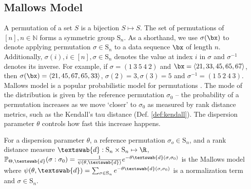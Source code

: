 
\subsection{Mallows Model} \label{sec:background:MM}
A permutation of a set $S$ is a bijection $S\mapsto S$. The set of permutations of $[n], n \in \mathbb{N}$ forms a symmetric group $\mathrm{S}_n$. As a shorthand, we use $\sigma(\bx)$ to denote applying permutation $\sigma \in \mathrm{S}_n$ to a data sequence $\bx$ of length $n$. Additionally, $\sigma(i), i\in [n], \sigma \in \mathrm{S}_n$ denotes the value at index $i$ in $\sigma$ and $\sigma^{-1}$ denotes its inverse. For example, if $\sigma=( 1 \: 3 \: 5\: 4\: 2)$ and $\bx=\langle 21, 33, 45, 65 , 67\rangle$, then $\sigma(\bx)=\langle 21, 45, 67, 65, 33\rangle$, $\sigma(2)=3, \sigma(3)=5$ and $\sigma^{-1}=(1 \: 5 \: 2 \: 4 \: 3)$.
\\Mallows model is a popular probabilistic model for permutations \citep{MM}.  %
The mode of the distribution is given
by the reference permutation $\sigma_0$ -- the probability of a permutation increases as we move `closer' to $\sigma_0$ as measured by rank distance metrics, such as the Kendall's tau distance (Def. \ref{def:kendall}). The dispersion parameter $\theta$ controls how fast this increase happens.  %


\begin{defn}
\label{def: mallows}
For a dispersion parameter $\theta$, a reference permutation $\sigma_o \in \mathrm{S}_n$, and a rank distance measure $\textswab{d}: \mathrm{S}_n \times \mathrm{S}_n \mapsto \R $,   
$
\mathbb{P}_{\Theta,\textswab{d}}(\sigma:\sigma_0)=\frac{1}{\psi(\theta,\textswab{d})} e^{-\theta  \textswab{d}(\sigma, \sigma_0)}$
is the Mallows model where $\psi(\theta,\textswab{d})=\sum_{\sigma \in \mathrm{S}_n} e^{-\theta \textswab{d}(\sigma,\sigma_0)}$ is a normalization term and  $\sigma \in \mathrm{S}_n$.
\end{defn}





